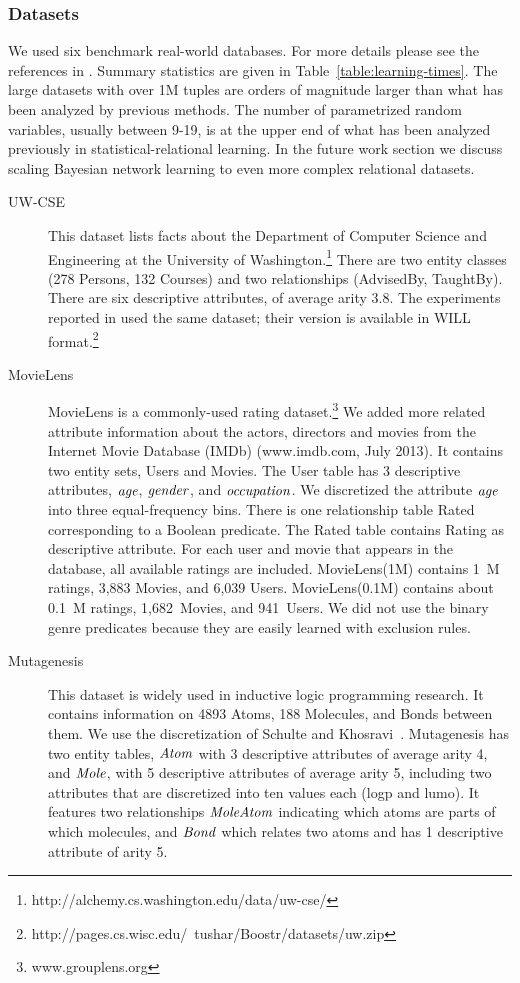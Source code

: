 \documentclass[runningheads,a4paper]{llncs}
\begin{document}
\subsubsection{Datasets}
We used six benchmark real-world databases. For more details please see the references in \cite{Schulte2012}. Summary statistics are given in Table~\ref{table:learning-times}.   The large datasets with over 1M tuples are orders of magnitude larger than what has been analyzed by previous methods. The number of parametrized random variables, usually between 9-19, is at the upper end of what has been analyzed previously in statistical-relational learning. In the future work section we discuss scaling Bayesian network learning to even more complex relational datasets.


\begin{description}

\item[UW-CSE] This dataset \cite{Kok2005a} lists facts about the Department of Computer Science and Engineering at the University of Washington.\footnote{http://alchemy.cs.washington.edu/data/uw-cse/}  There are two entity classes (278 Persons, 132 Courses) and two relationships (AdvisedBy, TaughtBy). There are six descriptive attributes, of average arity 3.8. The experiments reported in \cite{Natarajan2012} used the same dataset; their version is available in WILL format.\footnote{http://pages.cs.wisc.edu/~tushar/Boostr/datasets/uw.zip}

\item[MovieLens] MovieLens is a  commonly-used rating dataset.\footnote {www.grouplens.org} We added more related attribute information about the actors, directors and movies from the Internet Movie Database (IMDb) (www.imdb.com, July 2013).
It contains two entity sets, Users and Movies. The User table has 3 descriptive attributes, $\mathit{age}$, $\it{gender}$, and $\it{occupation}$. We discretized the attribute $\mathit{age}$ into three equal-frequency bins. There is one relationship table Rated corresponding to a Boolean predicate. The Rated table contains Rating as descriptive attribute. For each user and movie that appears in the database, all available ratings are included. MovieLens(1M) contains 1~M ratings, 3,883 Movies, and 6,039 Users. MovieLens(0.1M) contains about 0.1~M ratings, 1,682~Movies, and 941~Users. We did not use the binary genre predicates because they are easily learned with exclusion rules. 


\item[Mutagenesis] This dataset is widely used in inductive logic programming research. 
It contains information on 4893 Atoms, 188 Molecules, and Bonds between them. We use the discretization of Schulte and Khosravi~\cite{Schulte2012}. Mutagenesis has two entity tables, $\it{Atom}$ with 3 descriptive attributes of average arity 4, and $\it{Mole}$, with %
5 descriptive attributes of average arity 5, including two attributes that are discretized into ten values each (logp and lumo). It features two relationships $\it{MoleAtom}$ indicating which atoms are parts of which molecules, and $\it{Bond}$ which relates two atoms and has 1 descriptive attribute of arity 5. 


\end{description}
\end{document}
